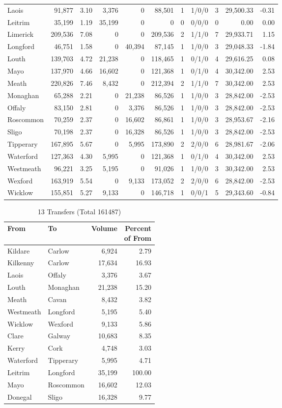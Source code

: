 \documentclass[a4paper]{article}
\begin{document}
\begin{longtable}{lrrrrrrlrrr}
Laois&91,877& 3.10&3,376&0&88,501&1&1/0/0&3&29,500.33&-0.31\\ 
Leitrim&35,199& 1.19&35,199&0&0&0&0/0/0&0& 0.00& 0.00\\ 
Limerick&209,536& 7.08&0&0&209,536&2&1/1/0&7&29,933.71& 1.15\\ 
Longford&46,751& 1.58&0&40,394&87,145&1&1/0/0&3&29,048.33&-1.84\\ 
Louth&139,703& 4.72&21,238&0&118,465&1&0/1/0&4&29,616.25& 0.08\\ 
Mayo&137,970& 4.66&16,602&0&121,368&1&0/1/0&4&30,342.00& 2.53\\ 
Meath&220,826& 7.46&8,432&0&212,394&2&1/1/0&7&30,342.00& 2.53\\ 
Monaghan&65,288& 2.21&0&21,238&86,526&1&1/0/0&3&28,842.00&-2.53\\ 
Offaly&83,150& 2.81&0&3,376&86,526&1&1/0/0&3&28,842.00&-2.53\\ 
Roscommon&70,259& 2.37&0&16,602&86,861&1&1/0/0&3&28,953.67&-2.16\\ 
Sligo&70,198& 2.37&0&16,328&86,526&1&1/0/0&3&28,842.00&-2.53\\ 
Tipperary&167,895& 5.67&0&5,995&173,890&2&2/0/0&6&28,981.67&-2.06\\ 
Waterford&127,363& 4.30&5,995&0&121,368&1&0/1/0&4&30,342.00& 2.53\\ 
Westmeath&96,221& 3.25&5,195&0&91,026&1&1/0/0&3&30,342.00& 2.53\\ 
Wexford&163,919& 5.54&0&9,133&173,052&2&2/0/0&6&28,842.00&-2.53\\ 
Wicklow&155,851& 5.27&9,133&0&146,718&1&0/0/1&5&29,343.60&-0.84\\ 
\end{longtable}

\begin{table}[htbp]
\caption{13 Transfers (Total 161487)}
\centering
\begin{tabular}{llrr} \toprule
From &To &Volume &\shortstack{Percent\\of From} \\ \midrule
Kildare&Carlow&6,924& 2.79\\ 
Kilkenny&Carlow&17,634&16.93\\ 
Laois&Offaly&3,376& 3.67\\ 
Louth&Monaghan&21,238&15.20\\ 
Meath&Cavan&8,432& 3.82\\ 
Westmeath&Longford&5,195& 5.40\\ 
Wicklow&Wexford&9,133& 5.86\\ 
Clare&Galway&10,683& 8.35\\ 
Kerry&Cork&4,748& 3.03\\ 
Waterford&Tipperary&5,995& 4.71\\ 
Leitrim&Longford&35,199&100.00\\ 
Mayo&Roscommon&16,602&12.03\\ 
Donegal&Sligo&16,328& 9.77\\ 
\bottomrule
\end{tabular}
\end{table}
\end{document}
